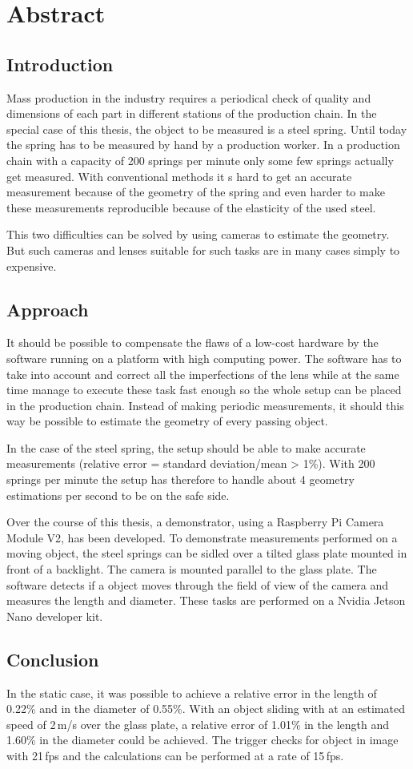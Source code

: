 \chapter*{Abstract}

\section*{Introduction}
Mass production in the industry requires a periodical check of quality and dimensions of each part in different stations of the production chain.
In the special case of this thesis, the object to be measured is a steel spring.
Until today the spring has to be measured by hand by a production worker. In a production chain with a capacity of 200 springs per minute only some few springs actually get measured.
With conventional methods it s hard to get an accurate measurement because of the geometry of the spring and even harder to make these measurements reproducible because of the elasticity of the used steel.

This two difficulties can be solved by using cameras to estimate the geometry.
But such cameras and lenses suitable for such tasks are in many cases simply to expensive.

\section*{Approach}
It should be possible to compensate the flaws of a low-cost hardware by the software running on a platform with high computing power.
The software has to take into account and correct all the imperfections of the lens while at the same time manage to execute these task fast enough so the whole setup can be placed in the production chain.
Instead of making periodic measurements, it should this way be possible to estimate the geometry of every passing object.

In the case of the steel spring, the setup should be able to make accurate measurements (relative error = standard deviation/mean > 1\%).
With 200 springs per minute the setup has therefore to handle about 4 geometry estimations per second to be on the safe side.

Over the course of this thesis, a demonstrator, using a Raspberry Pi Camera Module V2, has been developed.
To demonstrate measurements performed on a moving object, the steel springs can be sidled over a tilted glass plate mounted in front of a backlight.
The camera is mounted parallel to the glass plate.
The software detects if a object moves through the field of view of the camera and measures the length and diameter.
These tasks are performed on a Nvidia Jetson Nano developer kit.

\section*{Conclusion}
In the static case, it was possible to achieve a relative error in the length of 0.22\% and in the diameter of 0.55\%.
With an object sliding with at an estimated speed of 2\,m/s over the glass plate, a relative error of 1.01\% in the length and 1.60\% in the diameter could be achieved.
The trigger checks for object in image with 21\,fps and the calculations can be performed at a rate of 15\,fps. 

